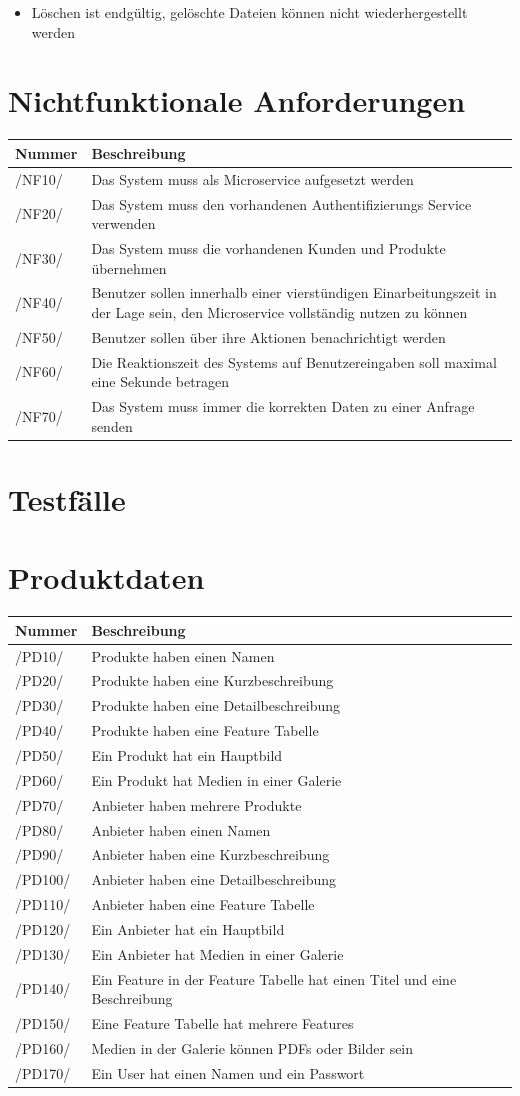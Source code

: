 \documentclass[a4paper,12pt]{article}
\newcommand\addrow[2]{#1 &#2\\ }
\newcommand\addheading[2]{#1 &#2\\ \hline}
\newcommand\tabularhead{\begin{tabular}{lp{13cm}}
\hline
}
\newenvironment{usecase}{\tabularhead}
{\hline\end{tabular}}
\begin{document}
\begin{itemize}

\item
  Löschen ist endgültig, gelöschte Dateien können nicht
  wiederhergestellt werden
\end{itemize}

\section{Nichtfunktionale Anforderungen}
\begin{usecase}
  \addheading{Nummer}{Beschreibung} 
  \addrow{/NF10/}{Das System muss als Microservice aufgesetzt werden}  
  \addrow{/NF20/}{Das System muss den vorhandenen Authentifizierungs Service verwenden}
  \addrow{/NF30/}{Das System muss die vorhandenen Kunden und Produkte übernehmen}
  \addrow{/NF40/}{Benutzer sollen innerhalb einer vierstündigen Einarbeitungszeit in der Lage sein, den Microservice vollständig nutzen zu können}
  \addrow{/NF50/}{Benutzer sollen über ihre Aktionen benachrichtigt werden}
  \addrow{/NF60/}{Die Reaktionszeit des Systems auf Benutzereingaben soll maximal eine Sekunde betragen}
  \addrow{/NF70/}{Das System muss immer die korrekten Daten zu einer Anfrage senden}
\end{usecase}

\clearpage

\section{Testfälle}

\section{Produktdaten}
\begin{usecase}
  \addheading{Nummer}{Beschreibung} 
  \addrow{/PD10/}{Produkte haben einen Namen}
  \addrow{/PD20/}{Produkte haben eine Kurzbeschreibung}
  \addrow{/PD30/}{Produkte haben eine Detailbeschreibung}
  \addrow{/PD40/}{Produkte haben eine Feature Tabelle}
  \addrow{/PD50/}{Ein Produkt hat ein Hauptbild}
  \addrow{/PD60/}{Ein Produkt hat Medien in einer Galerie} 
  \addrow{/PD70/}{Anbieter haben mehrere Produkte}
  \addrow{/PD80/}{Anbieter haben einen Namen}
  \addrow{/PD90/}{Anbieter haben eine Kurzbeschreibung}
  \addrow{/PD100/}{Anbieter haben eine Detailbeschreibung}
  \addrow{/PD110/}{Anbieter haben eine Feature Tabelle}
  \addrow{/PD120/}{Ein Anbieter hat ein Hauptbild}
  \addrow{/PD130/}{Ein Anbieter hat Medien in einer Galerie} 
  \addrow{/PD140/}{Ein Feature in der Feature Tabelle hat einen Titel und eine Beschreibung}
  \addrow{/PD150/}{Eine Feature Tabelle hat mehrere Features}
  \addrow{/PD160/}{Medien in der Galerie können PDFs oder Bilder sein}
  \addrow{/PD170/}{Ein User hat einen Namen und ein Passwort}
\end{usecase}
\end{document}
